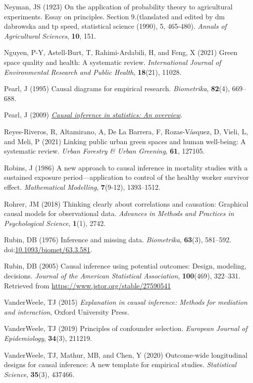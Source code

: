 \documentclass[
  singlecolumn]{article}
\newlength{\cslhangindent}
\newenvironment{CSLReferences}[2] %
 {\begin{list}{}{%
  \setlength{\itemindent}{0pt}
  \setlength{\leftmargin}{0pt}
  \setlength{\parsep}{0pt}
  \ifodd #1
   \setlength{\leftmargin}{\cslhangindent}
   \setlength{\itemindent}{-1\cslhangindent}
  \fi
  \setlength{\itemsep}{#2\baselineskip}}}
 {\end{list}}
\begin{document}
\begin{CSLReferences}{1}{0}
Neyman, JS (1923) On the application of probability theory to
agricultural experiments. Essay on principles. Section 9.(tlanslated and
edited by dm dabrowska and tp speed, statistical science (1990), 5,
465-480). \emph{Annals of Agricultural Sciences}, \textbf{10}, 151.

Nguyen, P-Y, Astell-Burt, T, Rahimi-Ardabili, H, and Feng, X (2021)
Green space quality and health: A systematic review. \emph{International
Journal of Environmental Research and Public Health}, \textbf{18}(21),
11028.

Pearl, J (1995) Causal diagrams for empirical research.
\emph{Biometrika}, \textbf{82}(4), 669--688.

Pearl, J (2009) \emph{\href{https://doi.org/10.1214/09-SS057}{Causal
inference in statistics: An overview}}.

Reyes-Riveros, R, Altamirano, A, De La Barrera, F, Rozas-Vásquez, D,
Vieli, L, and Meli, P (2021) Linking public urban green spaces and human
well-being: A systematic review. \emph{Urban Forestry \& Urban
Greening}, \textbf{61}, 127105.

Robins, J (1986) A new approach to causal inference in mortality studies
with a sustained exposure period---application to control of the healthy
worker survivor effect. \emph{Mathematical Modelling}, \textbf{7}(9-12),
1393--1512.

Rohrer, JM (2018) Thinking clearly about correlations and causation:
Graphical causal models for observational data. \emph{Advances in
Methods and Practices in Psychological Science}, \textbf{1}(1), 2742.

Rubin, DB (1976) Inference and missing data. \emph{Biometrika},
\textbf{63}(3), 581--592.
doi:\href{https://doi.org/10.1093/biomet/63.3.581}{10.1093/biomet/63.3.581}.

Rubin, DB (2005) Causal inference using potential outcomes: Design,
modeling, decisions. \emph{Journal of the American Statistical
Association}, \textbf{100}(469), 322--331. Retrieved from
\url{https://www.jstor.org/stable/27590541}

VanderWeele, TJ (2015) \emph{Explanation in causal inference: Methods
for mediation and interaction}, Oxford University Press.

VanderWeele, TJ (2019) Principles of confounder selection.
\emph{European Journal of Epidemiology}, \textbf{34}(3), 211219.

VanderWeele, TJ, Mathur, MB, and Chen, Y (2020) Outcome-wide
longitudinal designs for causal inference: A new template for empirical
studies. \emph{Statistical Science}, \textbf{35}(3), 437466.

\end{CSLReferences}
\end{document}
